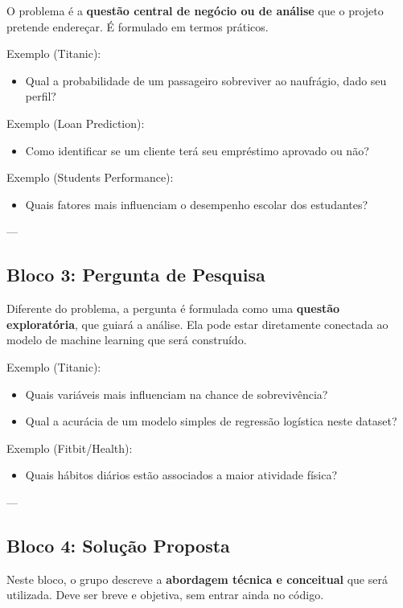 \documentclass[12pt,a4paper]{article}
\begin{document}
O problema é a \textbf{questão central de negócio ou de análise} que o projeto pretende endereçar. É formulado em termos práticos.

Exemplo (Titanic):
\begin{itemize}
  \item Qual a probabilidade de um passageiro sobreviver ao naufrágio, dado seu perfil?
\end{itemize}

Exemplo (Loan Prediction):
\begin{itemize}
  \item Como identificar se um cliente terá seu empréstimo aprovado ou não?
\end{itemize}

Exemplo (Students Performance):
\begin{itemize}
  \item Quais fatores mais influenciam o desempenho escolar dos estudantes?
\end{itemize}

---

\subsection{Bloco 3: Pergunta de Pesquisa}

Diferente do problema, a pergunta é formulada como uma \textbf{questão exploratória}, que guiará a análise. Ela pode estar diretamente conectada ao modelo de machine learning que será construído.

Exemplo (Titanic):
\begin{itemize}
  \item Quais variáveis mais influenciam na chance de sobrevivência?
  \item Qual a acurácia de um modelo simples de regressão logística neste dataset?
\end{itemize}

Exemplo (Fitbit/Health):
\begin{itemize}
  \item Quais hábitos diários estão associados a maior atividade física?
\end{itemize}

---

\subsection{Bloco 4: Solução Proposta}

Neste bloco, o grupo descreve a \textbf{abordagem técnica e conceitual} que será utilizada. Deve ser breve e objetiva, sem entrar ainda no código.
\end{document}
